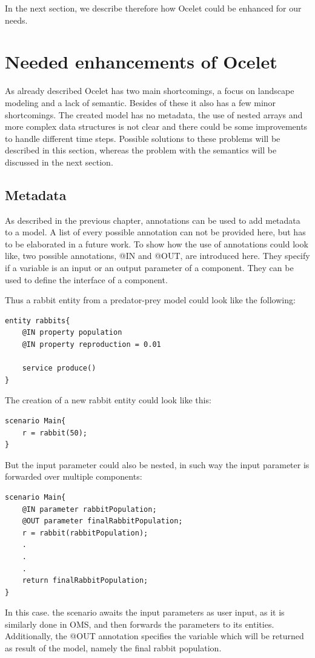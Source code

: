 \par
In the next section, we describe therefore how Ocelet could be enhanced for our needs.

\section{Needed enhancements of Ocelet}
\par
As already described Ocelet has two main shortcomings, a focus on landscape modeling and a lack of semantic. Besides of these it also has a few minor shortcomings. The created model has no metadata, the use of nested arrays and more complex data structures is not clear and there could be some improvements to handle different time steps. Possible solutions to these problems will be described in this section, whereas the problem with the semantics will be discussed in the next section.
\subsection{Metadata}
\par
As described in the previous chapter, annotations can be used to add metadata to a model. A list of every possible annotation can not be provided here, but has to be elaborated in a future work. To show how the use of annotations could look like, two possible annotations, @IN and @OUT, are introduced here. They specify if a variable is an input or an output parameter of a component. They can be used to define the interface of a component.
\par
Thus a rabbit entity from a predator-prey model could look like the following:
\begin{lstlisting}[language=Ocelet]
entity rabbits{
    @IN property population
    @IN property reproduction = 0.01   

    service produce()
}
\end{lstlisting}
The creation of a new rabbit entity could look like this:
\begin{lstlisting}[language=Ocelet]
scenario Main{
    r = rabbit(50);
}
\end{lstlisting}
But the input parameter could also be nested, in such way the input parameter is forwarded over multiple components:
\begin{lstlisting}[language=Ocelet]
scenario Main{
    @IN parameter rabbitPopulation;
    @OUT parameter finalRabbitPopulation;
    r = rabbit(rabbitPopulation);
    .
    .
    .
    return finalRabbitPopulation;
}
\end{lstlisting}
\par
In this case. the scenario awaits the input parameters as user input, as it is similarly done in OMS, and then forwards the parameters to its entities. Additionally, the @OUT annotation specifies the variable which will be returned as result of the model, namely the final rabbit population.

